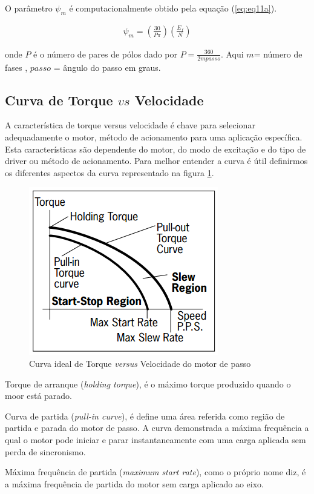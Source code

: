 O parâmetro $\psi_m$ é computacionalmente obtido pela equação (\ref{eq:eq11a}).

\begin{eqnarray}
\label{eq:eq11a}
\psi_m = \left(\frac{30}{P \pi}\right) \left(\frac{E_f}{N}\right)
\end{eqnarray}

onde $P$ é o número de pares de pólos dado por $P = \frac{360}{2mpasso}$. Aqui $m$= número de fases , $passo$ = ângulo do passo em graus.


\subsection{Curva de Torque $vs$ Velocidade}
A característica de torque versus velocidade é chave para selecionar adequadamente o motor, método de acionamento para uma aplicação específica. Esta características são dependente do motor, do modo de excitação e do tipo de driver ou método de acionamento. Para melhor entender a curva é útil definirmos os diferentes aspectos da curva representado na figura \ref{fig:fig3}.

\begin{figure}[H]
	\centering
	\includegraphics[scale=.60]{Images/curvatorquevelocidade_HSM.PNG}
	\caption{ Curva ideal de Torque \textit{versus} Velocidade do motor de passo }
	\label{fig:fig3}
\end{figure}
Torque de arranque (\textit{holding torque}), é o máximo torque produzido quando o moor está parado.

Curva de partida (\textit{pull-in curve}), é define uma área referida como região de partida e parada do motor de passo. A curva demonstrada a máxima frequência a qual o motor pode iniciar e parar instantaneamente com uma carga aplicada sem perda de sincronismo.

Máxima frequência de partida (\textit{maximum start rate}), como o próprio nome diz, é a máxima frequência de partida do motor sem carga aplicado ao eixo.

